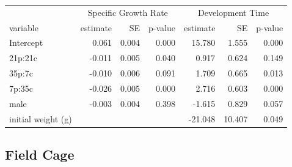 \documentclass[
]{article}
\begin{document}
\begin{tbl}

\begin{minipage}{\linewidth}

\begingroup
\fontsize{12.0pt}{14.4pt}\selectfont
\begin{longtable*}{lrrrrrr}
\toprule
 &  &  \\ 
\cmidrule(lr){2-4} \cmidrule(lr){5-7}
variable & estimate & SE & p-value & estimate & SE & p-value \\ 
\midrule\addlinespace[2.5pt]
Intercept & 0.061 & 0.004 & 0.000 & 15.780 & 1.555 & 0.000 \\ 
21p:21c & -0.011 & 0.005 & 0.040 & 0.917 & 0.624 & 0.149 \\ 
35p:7c & -0.010 & 0.006 & 0.091 & 1.709 & 0.665 & 0.013 \\ 
7p:35c & -0.026 & 0.005 & 0.000 & 2.716 & 0.603 & 0.000 \\ 
male & -0.003 & 0.004 & 0.398 & -1.615 & 0.829 & 0.057 \\ 
initial weight (g) &  &  &  & -21.048 & 10.407 & 0.049 \\ 
\bottomrule
\end{longtable*}
\endgroup

\end{minipage}%

\caption{\label{tbl-field-population-no-choice-model}Australian plague
locust physiological performance (specific growth rate and development
time) when constrained to specific diets with varying protein and
carbohydrate content. SE: standard error. Posthoc comparisons for both
physiological performance metrics can be seen in
Table~\ref{tbl-field-population-no-choice-experiment-phys-post-hoc}.}

\end{tbl}%

\subsection{Field Cage}\label{field-cage-1}
\end{document}
